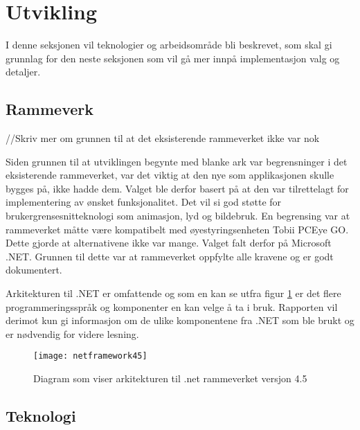  
 
 
\section{Utvikling} 
 
 
I denne seksjonen vil teknologier og arbeidsområde bli beskrevet, som skal gi grunnlag for den neste seksjonen som vil gå mer innpå implementasjon valg og detaljer. 
 
 
\subsection{Rammeverk} //Skriv mer om  grunnen til at det eksisterende rammeverket ikke var nok 
 
 
Siden grunnen til at utviklingen begynte med blanke ark var begrensninger i det eksisterende rammeverket, var det viktig at den nye som applikasjonen skulle bygges på, ikke hadde dem. Valget ble derfor basert på at den var tilrettelagt for implementering av ønsket funksjonalitet. Det vil si god støtte for brukergrensesnitteknologi som animasjon, lyd og bildebruk. En begrensing var at rammeverket måtte være kompatibelt med øyestyringsenheten Tobii PCEye GO. Dette gjorde at alternativene ikke var mange.  
Valget falt derfor på Microsoft .NET. Grunnen til dette var at rammeverket oppfylte alle kravene og er godt dokumentert. 
 
 
Arkitekturen til .NET er omfattende og som en kan se utfra figur \ref{fig:net-arkitektur} er det flere programmeringsspråk og komponenter en kan velge å ta i bruk. Rapporten vil derimot kun gi informasjon om de ulike komponentene fra .NET som ble brukt og er nødvendig for videre lesning. 
 
 
\begin{figure}[ht] 
\centering 
\texttt{[image: netframework45]} 
\caption{Diagram som viser arkitekturen til .net rammeverket versjon 4.5} 
\label{fig:net-arkitektur} 
\end{figure} 
 
 
\subsection{Teknologi} 
 
